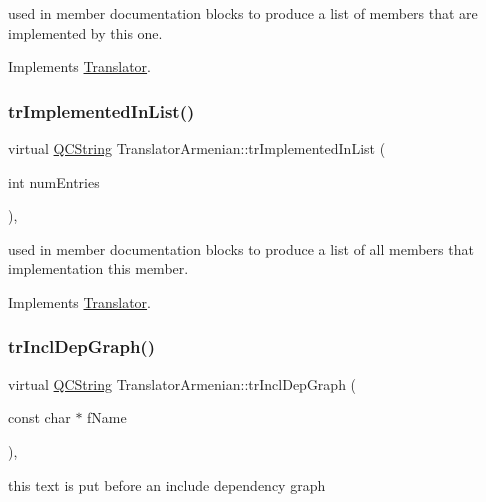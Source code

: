 used in member documentation blocks to produce a list of members that are implemented by this one. 

Implements \mbox{\hyperlink{class_translator}{Translator}}.

\mbox{\label{class_translator_armenian_a7eeb59fe4d53f138c5d81d41137ad70b}} 
\subsubsection{\texorpdfstring{trImplementedInList()}{trImplementedInList()}}
{\footnotesize\ttfamily virtual \mbox{\hyperlink{class_q_c_string}{Q\+C\+String}} Translator\+Armenian\+::tr\+Implemented\+In\+List (\begin{DoxyParamCaption}\item[{int}]{num\+Entries }\end{DoxyParamCaption})\hspace{0.3cm}{\ttfamily [inline]}, {\ttfamily [virtual]}}

used in member documentation blocks to produce a list of all members that implementation this member. 

Implements \mbox{\hyperlink{class_translator}{Translator}}.

\mbox{\label{class_translator_armenian_ad0eb8c18ebea33c271701909caa24755}} 
\subsubsection{\texorpdfstring{trInclDepGraph()}{trInclDepGraph()}}
{\footnotesize\ttfamily virtual \mbox{\hyperlink{class_q_c_string}{Q\+C\+String}} Translator\+Armenian\+::tr\+Incl\+Dep\+Graph (\begin{DoxyParamCaption}\item[{const char $\ast$}]{f\+Name }\end{DoxyParamCaption})\hspace{0.3cm}{\ttfamily [inline]}, {\ttfamily [virtual]}}

this text is put before an include dependency graph 

